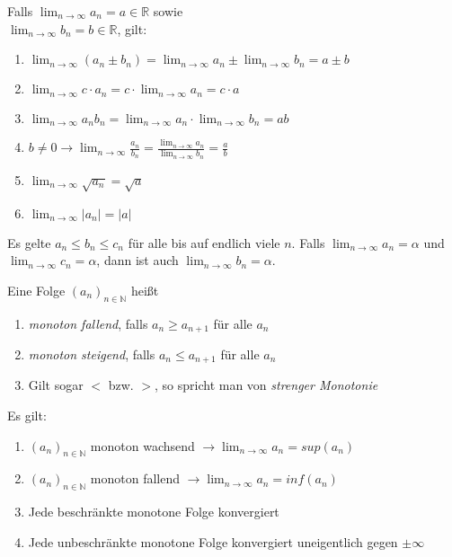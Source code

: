 \documentclass[]{article}
\begin{document}
\begin{satz}
	Falls $\lim_{n \rightarrow \infty} a_n = a \in \mathbb{R}$ sowie \\ $\lim_{n \rightarrow \infty} b_n = b \in \mathbb{R}$, gilt:
	\begin{enumerate}[noitemsep]
		\item $\lim_{n \rightarrow \infty} (a_n \pm b_n) = \lim_{n \rightarrow \infty} a_n \pm \lim_{n \rightarrow \infty} b_n = a \pm b $
		\item $\lim_{n \rightarrow \infty} c \cdot a_n = c \cdot \lim_{n \rightarrow \infty} a_n = c \cdot a  $
		\item $\lim_{n \rightarrow \infty} a_nb_n = \lim_{n \rightarrow \infty} a_n \cdot \lim_{n \rightarrow \infty} b_n = ab  $
		\item $b \neq 0 \rightarrow\lim_{n \rightarrow \infty} \frac{a_n}{b_n} = \frac{\lim_{n \rightarrow \infty} a_n}{\lim_{n \rightarrow \infty} b_n} = \frac{a}{b} $
		\item $\lim_{n \rightarrow \infty} \sqrt{a_n} = \sqrt{a} $
		\item $\lim_{n \rightarrow \infty} |a_n| = |a| $
	\end{enumerate}
\end{satz}

\begin{satz}[Einschließungsregel]
	Es gelte $a_n \leq b_n \leq c_n$ für alle bis auf endlich viele $n$. Falls $\lim_{n \rightarrow \infty} a_n = \alpha$ und $\lim_{n \rightarrow \infty} c_n = \alpha $, dann ist auch $\lim_{n \rightarrow \infty} b_n = \alpha$.
\end{satz}

\begin{definition}
	Eine Folge $(a_n)_{n \in \mathbb{N}}$ heißt
	\begin{enumerate}[noitemsep]
		\item \emph{monoton fallend}, falls $a_n \geq a_{n+1}$ für alle $a_n$
		\item \emph{monoton steigend}, falls $a_n \leq a_{n+1}$ für alle $a_n$
		\item Gilt sogar $<$ bzw. $>$, so spricht man von \emph{strenger Monotonie}
	\end{enumerate}
\end{definition}

\begin{satz}
	Es gilt:
	\begin{enumerate}[noitemsep]
		\item $(a_n)_{n \in \mathbb{N}}$ monoton wachsend $\rightarrow \lim_{n \rightarrow \infty} a_n = sup(a_n)$
		\item $(a_n)_{n \in \mathbb{N}}$ monoton fallend $\rightarrow \lim_{n \rightarrow \infty} a_n = inf(a_n)$
		\item Jede beschränkte monotone Folge konvergiert
		\item Jede unbeschränkte monotone Folge konvergiert uneigentlich gegen $\pm \infty$
	\end{enumerate}
\end{satz}
\end{document}
